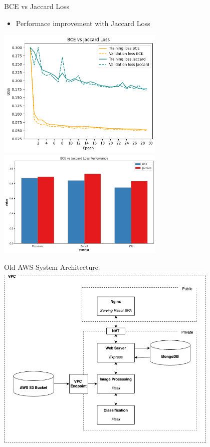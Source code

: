 \begin{frame}{BCE vs Jaccard Loss}
    \centering
    \begin{itemize}
        \item Performace improvement with Jaccard Loss
    \end{itemize}  
    \includegraphics[height=0.6\textheight,width=0.6\textwidth,keepaspectratio]{images/mm_BCE_Jaccard_loss.png}
    \includegraphics[height=0.6\textheight,width=0.6\textwidth,keepaspectratio]{images/mm_BCE_Jaccard_performance.png}
\end{frame}

\begin{frame}{Old AWS System Architecture}
    \centering
    \includegraphics[height=0.8\textheight,width=0.8\textwidth,keepaspectratio]{images/mm_system.png}
\end{frame}

